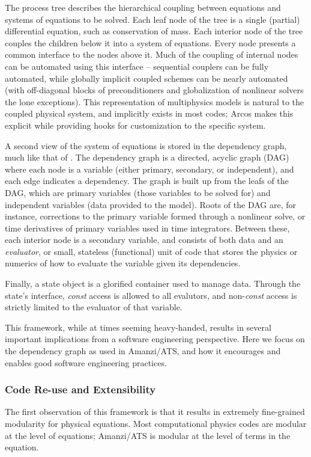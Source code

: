 The process tree describes the hierarchical coupling between equations and systems of equations to be solved.
Each leaf node of the tree is a single (partial) differential equation, such as conservation of mass.
Each interior node of the tree couples the children below it into a system of equations.
Every node presents a common interface to the nodes above it.
Much of the coupling of internal nodes can be automated using this interface -- sequential couplers can be fully automated, while globally implicit coupled schemes can be nearly automated (with off-diagonal blocks of preconditioners and globalization of nonlinear solvers the lone exceptions).
This representation of multiphysics models is natural to the coupled physical system, and implicitly exists in most codes; Arcos makes this explicit while providing hooks for customization to the specific system.

A second view of the system of equations is stored in the dependency graph, much like that of \cite{Notz2012}.
The dependency graph is a directed, acyclic graph (DAG) where each node is a variable (either primary, secondary, or independent), and each edge indicates a dependency.
The graph is built up from the leafs of the DAG, which are primary variables (those variables to be solved for) and independent variables (data provided to the model).  Roots of the DAG are, for instance, corrections to the primary variable formed through a nonlinear solve, or time derivatives of primary variables used in time integrators.
Between these, each interior node is a secondary variable, and consists of both data and an \emph{evaluator}, or small, stateless (functional) unit of code that stores the physics or numerics of how to evaluate the variable given its dependencies.

Finally, a state object is a glorified container used to manage data.
Through the state's interface, \emph{const} access is allowed to all evalutors, and non-\emph{const} access is strictly limited to the evaluator of that variable.

This framework, while at times seeming heavy-handed, results in several important implications from a software engineering perspective.
Here we focus on the dependency graph as used in Amanzi/ATS, and how it encourages and enables good software engineering practices.

\subsubsection{Code Re-use and Extensibility}
\label{sec:amanzi:modularity}
%
The first observation of this framework is that it results in extremely fine-grained modularity for physical equations.
Most computational physics codes are modular at the level of equations; Amanzi/ATS is modular at the level of terms in the equation.

